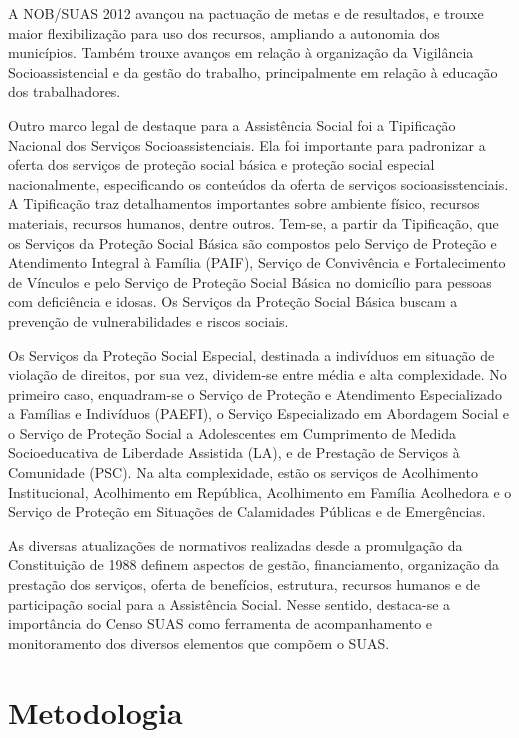\documentclass[brazilian]{report}
\begin{document}
A NOB/SUAS 2012 avançou na pactuação de metas e de resultados, e trouxe maior flexibilização para uso dos recursos, ampliando a autonomia dos municípios. Também trouxe avanços em relação à organização da Vigilância Socioassistencial e da gestão do trabalho, principalmente em relação à educação dos trabalhadores.

Outro marco legal de destaque para a Assistência Social foi a Tipificação Nacional dos Serviços Socioassistenciais. Ela foi importante para padronizar a oferta dos serviços de proteção social básica e proteção social especial nacionalmente, especificando os conteúdos da oferta de serviços socioasisstenciais. A Tipificação traz detalhamentos importantes sobre ambiente físico, recursos materiais, recursos humanos, dentre outros. Tem-se, a partir da Tipificação, que os Serviços da Proteção Social Básica são compostos pelo Serviço de Proteção e Atendimento Integral à Família (PAIF), Serviço de Convivência e Fortalecimento de Vínculos e pelo Serviço de Proteção Social Básica no domicílio para pessoas com deficiência e idosas. Os Serviços da Proteção Social Básica buscam a prevenção de vulnerabilidades e riscos sociais.

Os Serviços da Proteção Social Especial, destinada a indivíduos em situação de violação de direitos, por sua vez, dividem-se entre média e alta complexidade. No primeiro caso, enquadram-se o Serviço de Proteção e Atendimento Especializado a Famílias e Indivíduos (PAEFI), o Serviço Especializado em Abordagem Social e o Serviço de Proteção Social a Adolescentes em Cumprimento de Medida Socioeducativa de Liberdade Assistida (LA), e de Prestação de Serviços à Comunidade (PSC). Na alta complexidade, estão os serviços de Acolhimento Institucional, Acolhimento em República, Acolhimento em Família Acolhedora e o Serviço de Proteção em Situações de Calamidades Públicas e de Emergências.

As diversas atualizações de normativos realizadas desde a promulgação da Constituição de 1988 definem aspectos de gestão, financiamento, organização da prestação dos serviços, oferta de benefícios, estrutura, recursos humanos e de participação social para a Assistência Social. Nesse sentido, destaca-se a importância do Censo SUAS como ferramenta de acompanhamento e monitoramento dos diversos elementos que compõem o SUAS.

\chapter{Metodologia}
\end{document}
